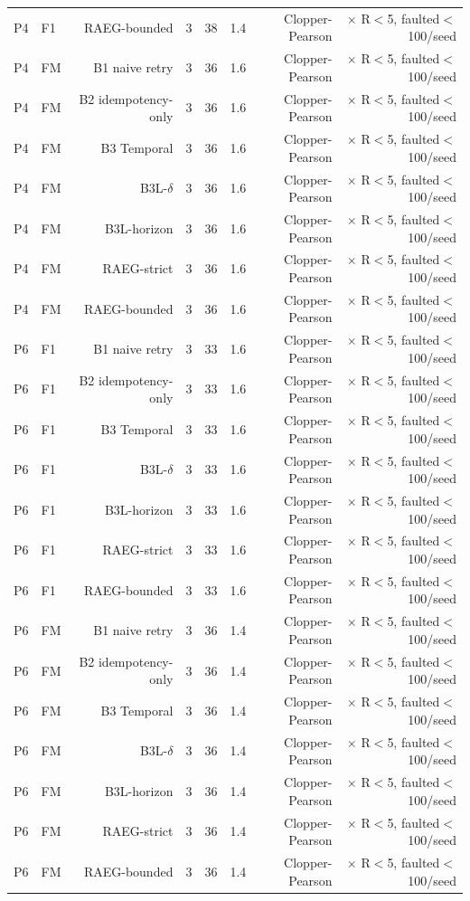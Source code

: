 \begin{table}[t]
\begin{tabular}{llrrrrrr}
P4 & F1 & RAEG-bounded & 3 & 38 & 1.4 & Clopper-Pearson & $\times$ R$<$5, faulted$<$100/seed \\
P4 & FM & B1 naive retry & 3 & 36 & 1.6 & Clopper-Pearson & $\times$ R$<$5, faulted$<$100/seed \\
P4 & FM & B2 idempotency-only & 3 & 36 & 1.6 & Clopper-Pearson & $\times$ R$<$5, faulted$<$100/seed \\
P4 & FM & B3 Temporal & 3 & 36 & 1.6 & Clopper-Pearson & $\times$ R$<$5, faulted$<$100/seed \\
P4 & FM & B3L-$\delta$ & 3 & 36 & 1.6 & Clopper-Pearson & $\times$ R$<$5, faulted$<$100/seed \\
P4 & FM & B3L-horizon & 3 & 36 & 1.6 & Clopper-Pearson & $\times$ R$<$5, faulted$<$100/seed \\
P4 & FM & RAEG-strict & 3 & 36 & 1.6 & Clopper-Pearson & $\times$ R$<$5, faulted$<$100/seed \\
P4 & FM & RAEG-bounded & 3 & 36 & 1.6 & Clopper-Pearson & $\times$ R$<$5, faulted$<$100/seed \\
P6 & F1 & B1 naive retry & 3 & 33 & 1.6 & Clopper-Pearson & $\times$ R$<$5, faulted$<$100/seed \\
P6 & F1 & B2 idempotency-only & 3 & 33 & 1.6 & Clopper-Pearson & $\times$ R$<$5, faulted$<$100/seed \\
P6 & F1 & B3 Temporal & 3 & 33 & 1.6 & Clopper-Pearson & $\times$ R$<$5, faulted$<$100/seed \\
P6 & F1 & B3L-$\delta$ & 3 & 33 & 1.6 & Clopper-Pearson & $\times$ R$<$5, faulted$<$100/seed \\
P6 & F1 & B3L-horizon & 3 & 33 & 1.6 & Clopper-Pearson & $\times$ R$<$5, faulted$<$100/seed \\
P6 & F1 & RAEG-strict & 3 & 33 & 1.6 & Clopper-Pearson & $\times$ R$<$5, faulted$<$100/seed \\
P6 & F1 & RAEG-bounded & 3 & 33 & 1.6 & Clopper-Pearson & $\times$ R$<$5, faulted$<$100/seed \\
P6 & FM & B1 naive retry & 3 & 36 & 1.4 & Clopper-Pearson & $\times$ R$<$5, faulted$<$100/seed \\
P6 & FM & B2 idempotency-only & 3 & 36 & 1.4 & Clopper-Pearson & $\times$ R$<$5, faulted$<$100/seed \\
P6 & FM & B3 Temporal & 3 & 36 & 1.4 & Clopper-Pearson & $\times$ R$<$5, faulted$<$100/seed \\
P6 & FM & B3L-$\delta$ & 3 & 36 & 1.4 & Clopper-Pearson & $\times$ R$<$5, faulted$<$100/seed \\
P6 & FM & B3L-horizon & 3 & 36 & 1.4 & Clopper-Pearson & $\times$ R$<$5, faulted$<$100/seed \\
P6 & FM & RAEG-strict & 3 & 36 & 1.4 & Clopper-Pearson & $\times$ R$<$5, faulted$<$100/seed \\
P6 & FM & RAEG-bounded & 3 & 36 & 1.4 & Clopper-Pearson & $\times$ R$<$5, faulted$<$100/seed \\
\bottomrule
\end{tabular}
\end{table}
